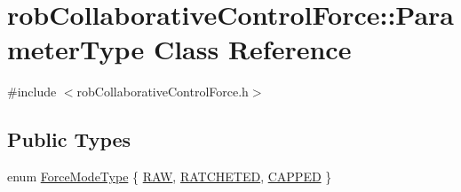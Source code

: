 \hypertarget{classrob_collaborative_control_force_1_1_parameter_type}{\section{rob\-Collaborative\-Control\-Force\-:\-:Parameter\-Type Class Reference}
\label{classrob_collaborative_control_force_1_1_parameter_type}
}


{\ttfamily \#include $<$rob\-Collaborative\-Control\-Force.\-h$>$}

\subsection*{Public Types}
\begin{DoxyCompactItemize}
\item 
enum \hyperlink{classrob_collaborative_control_force_1_1_parameter_type_ab4ec71e97ffffd412993ea4f307e9acf}{Force\-Mode\-Type} \{ \hyperlink{classrob_collaborative_control_force_1_1_parameter_type_ab4ec71e97ffffd412993ea4f307e9acfa4c6bc5746883675f68edea09f5073c19}{R\-A\-W}, 
\hyperlink{classrob_collaborative_control_force_1_1_parameter_type_ab4ec71e97ffffd412993ea4f307e9acfad1bda918937747259d06b2a3c9f5fb00}{R\-A\-T\-C\-H\-E\-T\-E\-D}, 
\hyperlink{classrob_collaborative_control_force_1_1_parameter_type_ab4ec71e97ffffd412993ea4f307e9acfa1fddeac5565c7f920f05673521a21e9c}{C\-A\-P\-P\-E\-D}
 \}
\end{DoxyCompactItemize}
